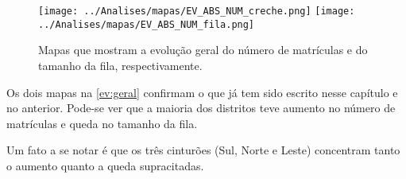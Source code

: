 \begin{figure}[H]
	\centering
	\texttt{[image: ../Analises/mapas/EV\_ABS\_NUM\_creche.png]}
	\texttt{[image: ../Analises/mapas/EV\_ABS\_NUM\_fila.png]}
	\caption{Mapas que mostram a evolução geral do número de matrículas e do tamanho da fila, respectivamente.}
	\label{ev:geral}
\end{figure}

Os dois mapas na \autoref{ev:geral} confirmam o que já tem sido escrito nesse capítulo e no anterior. Pode-se ver que a maioria dos distritos teve aumento no número de matrículas e queda no tamanho da fila.

Um fato a se notar é que os três cinturões (Sul, Norte e Leste) concentram tanto o aumento quanto a queda supracitadas.

